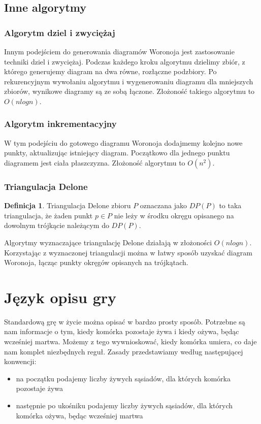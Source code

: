 \documentclass[declaration,shortabstract, inz]{iithesis}
\theoremstyle{definition} \newtheorem{definition}{Definicja}[]
\theoremstyle{plain} \newtheorem{remark}[definition]{Obserwacja}
\theoremstyle{plain} \newtheorem{theorem}[definition]{Twierdzenie}
\theoremstyle{plain} \newtheorem{example}{Przykład}[definition]
\theoremstyle{plain} \newtheorem{lemma}[definition]{Lemat}
\begin{document}
\section{Inne algorytmy}

\subsection{Algorytm dziel i zwyciężaj}

Innym podejściem do generowania diagramów Woronoja jest zastosowanie techniki dziel i zwyciężaj. Podczas każdego kroku algorytmu dzielimy zbiór, z którego generujemy diagram na dwa równe, rozłączne podzbiory. Po rekurencyjnym wywołaniu algorytmu i wygenerowaniu diagramu dla mniejszych zbiorów, wynikowe diagramy są ze sobą łączone. Złożoność takiego algorytmu to $O(nlogn)$.

\subsection{Algorytm inkrementacyjny}

W tym podejściu do gotowego diagramu Woronoja dodajmemy kolejno nowe punkty, aktualizując istniejący diagram. Początkowo dla jednego punktu diagramem jest ciała płaszczyzna. Złożoność algorytmu to $O(n^2)$.

\subsection{Triangulacja Delone}

\begin{definition}
Triangulacja Delone zbioru $P$ oznaczana jako $DP(P)$ to taka triangulacja, że żaden punkt $p \in P$ nie leży w środku okręgu opisanego na dowolnym trójkącie należącym do $DP(P)$. 
\end{definition}

Algorytmy wyznaczające triangulację Delone działają w złożoności $O(nlogn)$.
Korzystając z wyznaczonej triangulacji można w łatwy sposób uzyskać diagram Woronoja, łącząc punkty okręgów opisanych na trójkątach. 

\chapter{Język opisu gry}
Standardową grę w życie można opisać w bardzo prosty sposób. Potrzebne są nam informacje o tym, kiedy komórka pozostaje żywa i kiedy ożywa, będąc wcześniej martwa. Możemy z tego wywnioskować, kiedy komórka umiera, co daje nam komplet niezbędnych reguł. Zasady przedstawiamy według następującej konwencji:
\begin{itemize}
\item na początku podajemy liczby żywych sąsiadów, dla których komórka pozostaje żywa
\item następnie po ukośniku podajemy liczby żywych sąsiadów, dla których komórka ożywa, będąc wcześniej martwa
\end{itemize}
\end{document}
